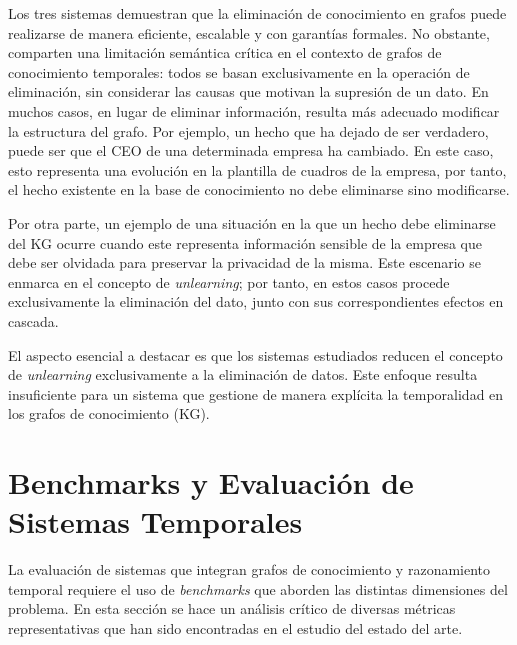 Los tres sistemas demuestran que la eliminación de conocimiento en grafos puede realizarse de manera eficiente, escalable y con garantías formales. No obstante, comparten una limitación semántica crítica en el contexto de grafos de conocimiento temporales: todos se basan exclusivamente en la operación de eliminación, sin considerar las causas que motivan la supresión de un dato. En muchos casos, en lugar de eliminar información, resulta más adecuado modificar la estructura del grafo. Por ejemplo, un hecho que ha dejado de ser verdadero, puede ser que el CEO de una determinada empresa ha cambiado. En este caso, esto representa una evolución en la plantilla de cuadros de la empresa, por tanto, el hecho existente en la base de conocimiento no debe eliminarse sino modificarse.

Por otra parte, un ejemplo de una situación en la que un hecho debe eliminarse del KG ocurre cuando este representa información sensible de la empresa que debe ser olvidada para preservar la privacidad de la misma. Este escenario se enmarca en el concepto de \emph{unlearning}; por tanto, en estos casos procede exclusivamente la eliminación del dato, junto con sus correspondientes efectos en cascada.

El aspecto esencial a destacar es que los sistemas estudiados reducen el concepto de \emph{unlearning} exclusivamente a la eliminación de datos. Este enfoque resulta insuficiente para un sistema que gestione de manera explícita la temporalidad en los grafos de conocimiento (KG).

\section{Benchmarks y Evaluación de Sistemas Temporales}\label{sec:benchmarks}

La evaluación de sistemas que integran grafos de conocimiento y razonamiento temporal requiere el uso de \emph{benchmarks} que aborden las distintas dimensiones del problema. En esta sección se hace un análisis crítico de diversas métricas representativas que han sido encontradas en el estudio del estado del arte.

